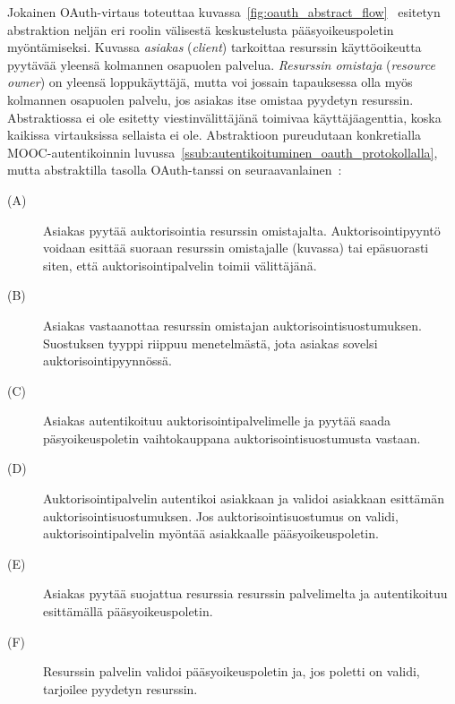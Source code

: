 \documentclass[finnish,gradu]{tktltiki}
\begin{document}
  Jokainen OAuth-virtaus toteuttaa kuvassa~\ref{fig:oauth_abstract_flow}~\cite{ietf_oauth2} esitetyn abstraktion neljän eri roolin välisestä keskustelusta pääsyoikeuspoletin myöntämiseksi. Kuvassa \emph{asiakas} (\emph{client}) tarkoittaa resurssin käyttöoikeutta pyytävää yleensä kolmannen osapuolen palvelua. \emph{Resurssin omistaja} (\emph{resource owner}) on yleensä loppukäyttäjä, mutta voi jossain tapauksessa olla myös kolmannen osapuolen palvelu, jos asiakas itse omistaa pyydetyn resurssin. Abstraktiossa ei ole esitetty viestinvälittäjänä toimivaa käyttäjäagenttia, koska kaikissa virtauksissa sellaista ei ole. Abstraktioon pureudutaan konkretialla MOOC-autentikoinnin luvussa~\ref{ssub:autentikoituminen_oauth_protokollalla}, mutta abstraktilla tasolla OAuth-tanssi on seuraavanlainen~\cite{ietf_oauth2}:

  \begin{description}
    \item[(A)]
      Asiakas pyytää auktorisointia resurssin omistajalta. Auktorisointipyyntö voidaan esittää suoraan resurssin omistajalle (kuvassa) tai epäsuorasti siten, että auktorisointipalvelin toimii välittäjänä.

    \item[(B)]
      Asiakas vastaanottaa resurssin omistajan auktorisointisuostumuksen. Suostuksen tyyppi riippuu menetelmästä, jota asiakas sovelsi auktorisointipyynnössä.

    \item[(C)]
      Asiakas autentikoituu auktorisointipalvelimelle ja pyytää saada päsyoikeuspoletin vaihtokauppana auktorisointisuostumusta vastaan.

    \item[(D)]
      Auktorisointipalvelin autentikoi asiakkaan ja validoi asiakkaan esittämän auktorisointisuostumuksen. Jos auktorisointisuostumus on validi, auktorisointipalvelin myöntää asiakkaalle pääsyoikeuspoletin.

    \item[(E)]
      Asiakas pyytää suojattua resurssia resurssin palvelimelta ja autentikoituu esittämällä pääsyoikeuspoletin.

    \item[(F)]
      Resurssin palvelin validoi pääsyoikeuspoletin ja, jos poletti on validi, tarjoilee pyydetyn resurssin.
  \end{description}
\end{document}
